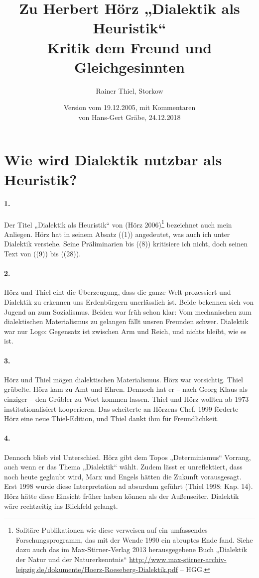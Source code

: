 \documentclass[a4paper,11pt]{article}
\title{Zu Herbert Hörz „Dialektik als Heuristik“ \\[6pt] \large Kritik dem
  Freund und Gleichgesinnten}
\author{Rainer Thiel, Storkow}
\date{Version vom 19.12.2005, mit Kommentaren\\ von Hans-Gert Gräbe,
  24.12.2018}
\begin{document}
\maketitle

\section*{Wie wird Dialektik nutzbar als Heuristik?}

\paragraph{1.}
Der Titel „Dialektik als Heuristik“ von (Hörz 2006)\footnote{Solitäre
  Publikationen wie diese verweisen auf ein umfassendes Forschungsprogramm,
  das mit der Wende 1990 ein abruptes Ende fand.  Siehe dazu auch das im
  Max-Stirner-Verlag 2013 herausgegebene Buch „Dialektik der Natur und der
  Naturerkenntnis“
  \url{http://www.max-stirner-archiv-leipzig.de/dokumente/Hoerz-Roeseberg-Dialektik.pdf}
  -- HGG.} bezeichnet auch mein Anliegen. Hörz hat in seinem Absatz ((1))
angedeutet, was auch ich unter Dialektik verstehe. Seine Präliminarien bis
((8)) kritisiere ich nicht, doch seinen Text von ((9)) bis ((28)).

\paragraph{2.}
Hörz und Thiel eint die Überzeugung, dass die ganze Welt prozessiert und
Dialektik zu erkennen uns Erdenbürgern unerlässlich ist. Beide bekennen sich
von Jugend an zum Sozialismus. Beiden war früh schon klar: Vom mechanischen
zum dialektischen Materialismus zu gelangen fällt unsren Freunden schwer.
Dialektik war nur Logo: Gegensatz ist zwischen Arm und Reich, und nichts
bleibt, wie es ist.

\paragraph{3.}
Hörz und Thiel mögen dialektischen Materialismus. Hörz war vorsichtig.  Thiel
grübelte. Hörz kam zu Amt und Ehren. Dennoch hat er -- nach Georg Klaus als
einziger -- den Grübler zu Wort kommen lassen. Thiel und Hörz wollten ab 1973
institutionalisiert kooperieren. Das scheiterte an Hörzens Chef. 1999 förderte
Hörz eine neue Thiel-Edition, und Thiel dankt ihm für Freundlichkeit.

\paragraph{4.}
Dennoch blieb viel Unterschied. Hörz gibt dem Topos „Determinismus“ Vorrang,
auch wenn er das Thema „Dialektik“ wählt. Zudem lässt er unreflektiert, dass
noch heute geglaubt wird, Marx und Engels hätten die Zukunft vorausgesagt.
Erst 1998 wurde diese Interpretation ad absurdum geführt (Thiel 1998:
Kap. 14).  Hörz hätte diese Einsicht früher haben können als der
Außenseiter. Dialektik wäre rechtzeitig ins Blickfeld gelangt.
\end{document}
